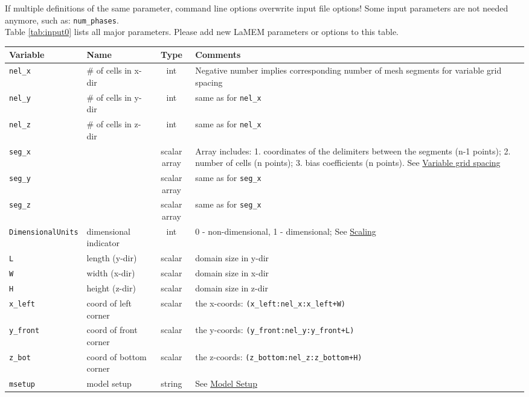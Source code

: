 \documentclass[a4paper,11pt]{article}
\begin{document}
\indent If multiple definitions of the same parameter, command line options overwrite input file options! Some input parameters are not needed anymore, such as: \texttt{num\_phases}. \\

\indent Table \ref{tab:input0} lists all major parameters. Please add new LaMEM parameters or options to this table.

\begin{table}[!htbp]
\begin{center}
\scriptsize
{\renewcommand{\arraystretch}{1.3}
  \begin{longtable}{ p{4cm} l c p{7cm} }
  \hline
Variable &Name&Type&Comments \\
\hline
\texttt{nel\_x}&\# of cells in x-dir&int&Negative number implies corresponding number of mesh segments for variable grid spacing\\
\texttt{nel\_y}&\# of cells in y-dir&int& same as for \texttt{nel\_x} \\
\texttt{nel\_z}&\# of cells in z-dir&int& same as for \texttt{nel\_x} \\
\texttt{seg\_x}&&scalar array& Array includes: 1. coordinates of the delimiters between the segments (n-1 points); 2. number of cells (n points); 3. bias coefficients (n points). See \hyperref[sec:variablegridspacing]{Variable grid spacing}\\
\texttt{seg\_y}&&scalar array& same as for \texttt{seg\_x}\\
\texttt{seg\_z}&&scalar array& same as for \texttt{seg\_x}\\
\texttt{DimensionalUnits}&dimensional indicator&int&0 - non-dimensional, 1 - dimensional; See \hyperref[sec:scaling]{Scaling} \\
\texttt{L}&length (y-dir)&scalar& domain size in y-dir\\
\texttt{W}&width (x-dir)&scalar& domain size in x-dir\\
\texttt{H}&height (z-dir)&scalar& domain size in z-dir\\
\texttt{x\_left}&coord of left corner&scalar&the x-coords: \texttt{(x\_left:nel\_x:x\_left+W)} \\
\texttt{y\_front}&coord of front corner&scalar& the y-coords: \texttt{(y\_front:nel\_y:y\_front+L)}\\
\texttt{z\_bot}&coord of bottom corner&scalar& the z-coords: \texttt{(z\_bottom:nel\_z:z\_bottom+H)}\\
\texttt{msetup}&model setup&string&See \hyperref[sec:modelsetup]{Model Setup}\\

\end{longtable}}
\end{center}
\end{table}
\end{document}
